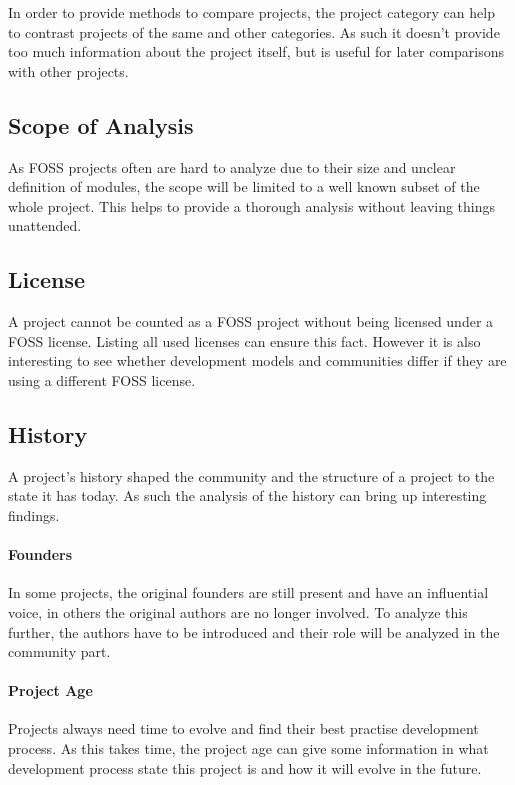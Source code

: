 In order to provide methods to compare projects, the project category can help
to contrast projects of the same and other categories. As such it doesn't
provide too much information about the project itself, but is useful for later
comparisons with other projects.

\subsection{Scope of Analysis}

As \ac{FOSS} projects often are hard to analyze due to their size and unclear
definition of modules, the scope will be limited to a well known subset of the
whole project. This helps to provide a thorough analysis without leaving things
unattended.

\subsection{License}

A project cannot be counted as a \ac{FOSS} project without being licensed under
a \ac{FOSS} license. Listing all used licenses can ensure this fact. However it
is also interesting to see whether development models and communities differ if
they are using a different \ac{FOSS} license.

\subsection{History}

A project's history shaped the community and the structure of a project to the
state it has today. As such the analysis of the history can bring up
interesting findings.

\paragraph{Founders}

In some projects, the original founders are still present and have an
influential voice, in others the original authors are no longer involved. To
analyze this further, the authors have to be introduced and their role will be
analyzed in the community part.

\paragraph{Project Age}

Projects always need time to evolve and find their best practise development
process. As this takes time, the project age can give some information in what
development process state this project is and how it will evolve in the future.

